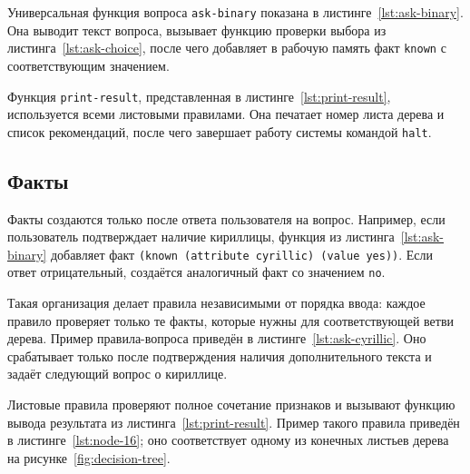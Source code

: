 Универсальная функция вопроса \texttt{ask-binary} показана в листинге~\ref{lst:ask-binary}. Она выводит текст вопроса, вызывает функцию проверки выбора из листинга~\ref{lst:ask-choice}, после чего добавляет в рабочую память факт \texttt{known} с соответствующим значением.


Функция \texttt{print-result}, представленная в листинге~\ref{lst:print-result}, используется всеми листовыми правилами. Она печатает номер листа дерева и список рекомендаций, после чего завершает работу системы командой \texttt{halt}.


\subsection{Факты}

Факты создаются только после ответа пользователя на вопрос. Например, если пользователь подтверждает наличие кириллицы, функция из листинга~\ref{lst:ask-binary} добавляет факт \texttt{(known (attribute cyrillic) (value yes))}. Если ответ отрицательный, создаётся аналогичный факт со значением \texttt{no}.

Такая организация делает правила независимыми от порядка ввода: каждое правило проверяет только те факты, которые нужны для соответствующей ветви дерева. Пример правила-вопроса приведён в листинге~\ref{lst:ask-cyrillic}. Оно срабатывает только после подтверждения наличия дополнительного текста и задаёт следующий вопрос о кириллице.


Листовые правила проверяют полное сочетание признаков и вызывают функцию вывода результата из листинга~\ref{lst:print-result}. Пример такого правила приведён в листинге~\ref{lst:node-16}; оно соответствует одному из конечных листьев дерева на рисунке~\ref{fig:decision-tree}.

